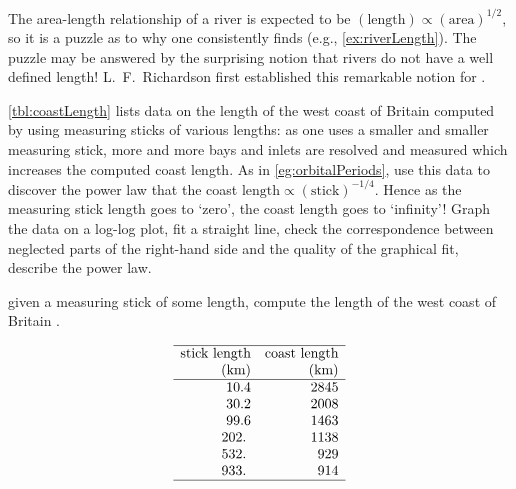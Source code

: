 \begin{exercise} \label{ex:coastlength} 
The area-length relationship of a river is expected to be \((\text{length})\propto(\text{area})^{1/2}\), so it is a puzzle as to why one consistently finds  (e.g., \autoref{ex:riverLength}).
The puzzle may be answered by the surprising notion that rivers do not have a well defined length!
L.~F.~Richardson first established this remarkable notion for .

\autoref{tbl:coastLength} lists data on the length of the west coast of Britain computed by using measuring sticks of various lengths: as one uses a smaller and smaller measuring stick, more and more bays and inlets are resolved and measured which increases the computed coast length. 
\setbox\ajrqrbox\hbox{}%
\marginpar{\usebox{\ajrqrbox\\[2ex]}}%
As in \autoref{eg:orbitalPeriods}, use this data to discover the power law that the coast \(\text{length}\propto(\text{stick})^{-1/4}\).
Hence as the measuring stick length goes to `zero', the coast length goes to `infinity'!  
Graph the data on a log-log plot, fit a straight line, check the correspondence between neglected parts of the right-hand side and the quality of the graphical fit, describe the power law.
\begin{table}
\caption{given a measuring stick of some length, compute the length of the west coast of Britain \cite[Plate~33]{Mandelbrot1982}.}
\label{tbl:coastLength}
\begin{equation*}
\begin{array}{rr} \hline
\text{stick length}&\text{coast length}\\
(\text{km})&\text{(km)}\\\hline
     10.4 & 2845 \\
     30.2 & 2008 \\
     99.6 & 1463 \\
    202.\ & 1138 \\
    532.\ &  929 \\
    933.\ &  914 \\
\hline
\end{array}
\end{equation*}
\end{table}%
\end{exercise}




